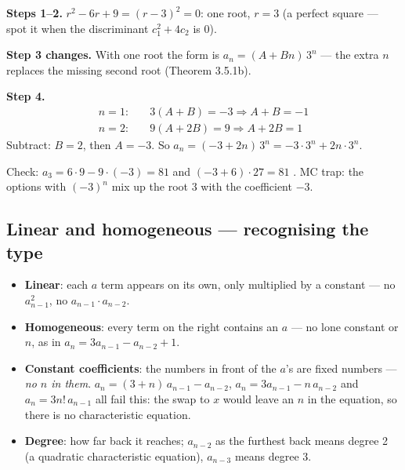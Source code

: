 \documentclass{fkt-notes}
\theoremstyle{definition}
\begin{document}
\begin{example}[Repeated root: $a_n = 6a_{n-1} - 9a_{n-2}$, $a_1 = -3$, $a_2 = 9$]
  \textbf{Steps 1--2.} $r^2 - 6r + 9 = (r-3)^2 = 0$: one root, $r = 3$
  (a perfect square --- spot it when the discriminant $c_1^2 + 4c_2$ is
  $0$).

  \textbf{Step 3 changes.} With one root the form is
  $a_n = (A + Bn)\,3^n$ --- the extra $n$ replaces the missing second root
  (Theorem 3.5.1b).

  \textbf{Step 4.}
  \begin{align*}
    n = 1: \quad & 3(A + B) = -3 \Rightarrow A + B = -1 \\
    n = 2: \quad & 9(A + 2B) = 9 \Rightarrow A + 2B = 1
  \end{align*}
  Subtract: $B = 2$, then $A = -3$. So
  $a_n = (-3 + 2n)\,3^n = -3\cdot3^n + 2n\cdot3^n$.

  Check: $a_3 = 6\cdot9 - 9\cdot(-3) = 81$ and
  $(-3+6)\cdot27 = 81$ \checkmark. MC trap: the options with
  $(-3)^n$ mix up the root $3$ with the coefficient $-3$.
\end{example}

\subsection{Linear and homogeneous --- recognising the type}
\begin{itemize}[nosep]
  \item \textbf{Linear}: each $a$ term appears on
        its own, only multiplied by a constant --- no $a_{n-1}^2$, no
        $a_{n-1} \cdot a_{n-2}$.
  \item \textbf{Homogeneous}: every term on the
        right contains an $a$ --- no lone constant or $n$, as in
        $a_n = 3a_{n-1} - a_{n-2} + 1$.
  \item \textbf{Constant coefficients}: the
        numbers in front of the $a$'s are fixed numbers --- \emph{no $n$
          in them}. $a_n = (3 + n)\,a_{n-1} - a_{n-2}$,
        $a_n = 3a_{n-1} - n\,a_{n-2}$ and $a_n = 3n!\,a_{n-1}$ all fail
        this: the swap to $x$ would leave an $n$ in the equation, so
        there is no characteristic equation.
  \item \textbf{Degree}: how far back it reaches;
        $a_{n-2}$ as the furthest back means degree 2 (a quadratic
        characteristic equation), $a_{n-3}$ means degree 3.
\end{itemize}
\end{document}
